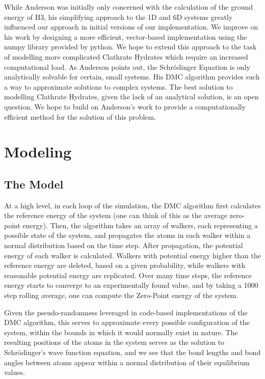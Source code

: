 \documentclass[journal=jacsat,manuscript=article]{achemso}
\begin{document}
While Anderson was initially only concerned with the calculation of the ground energy of H3, his simplifying approach to the 1D and 6D systems greatly influenced our approach in initial versions of our implementation. We improve on his work by designing a more efficient, vector-based implementation using the numpy library provided by python. We hope to extend this approach to the task of modelling more complicated Clathrate Hydrates which require an increased computational load.
As Anderson points out, the Schr\"odinger Equation is only analytically solvable for certain, small systems. His DMC algorithm provides such a way to approximate solutions to complex systems. The best solution to modelling Clathrate Hydrates, given the lack of an analytical solution, is an open question. We hope to build on Anderson's work to provide a computationally efficient method for the solution of this problem.


\section{Modeling}
\subsection{The Model}
At a high level, in each loop of the simulation, the DMC algorithm first calculates the reference energy of the system (one can think of this as the average zero-point energy). Then, the algorithm takes an array of walkers, each representing a possible state of the system, and propagates the atoms in each walker within a normal distribution based on the time step. After propagation, the potential energy of each walker is calculated. Walkers with potential energy higher than the reference energy are deleted, based on a given probability, while walkers with reasonable potential energy are replicated. Over many time steps, the reference energy starts to converge to an experimentally found value, and by taking a 1000 step rolling average, one can compute the Zero-Point energy of the system. 

Given the pseudo-randomness leveraged in code-based implementations of the DMC algorithm, this serves to approximate every possible configuration of the system, within the bounds in which it would normally exist in nature. The resulting positions of the atoms in the system serves as the solution to Schr\"odinger’s wave function equation, and we see that the bond lengths and bond angles between atoms appear within a normal distribution of their equilibrium values. 
\end{document}
